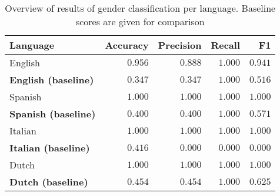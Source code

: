 \documentclass[utf8]{beamer}
\begin{document}
\begin{frame}
	\begin{table}
		\caption{Overview of results of gender classification per language. Baseline scores are given for comparison}
		\label{tab:scores-gender}
		\begin{center}
			\begin{tabular}{l|rrrr}
				\toprule
				Language & Accuracy & Precision & Recall & F1 \\
				\midrule
				English & $ 0.956 $ & $ 0.888 $ & $ 1.000 $ & $ 0.941 $ \\
				\textbf{English (baseline)} & $ 0.347 $ & $ 0.347 $ & $ 1.000 $ & $ 0.516 $ \\
				Spanish & $ 1.000 $ & $ 1.000 $ & $ 1.000 $ & $ 1.000 $ \\
				\textbf{Spanish (baseline)} & $ 0.400 $ & $ 0.400 $ & $ 1.000 $ & $ 0.571 $ \\
				Italian & $ 1.000 $ & $ 1.000 $ & $ 1.000 $ & $ 1.000 $ \\
				\textbf{Italian (baseline)} & $ 0.416 $ & $ 0.000 $ & $ 0.000 $ & $ 0.000 $ \\
				Dutch & $ 1.000 $ & $ 1.000 $ & $ 1.000 $ & $ 1.000 $ \\
				\textbf{Dutch (baseline)} & $ 0.454 $ & $ 0.454 $ & $ 1.000 $ & $ 0.625 $ \\
				\bottomrule
			\end{tabular}
		\end{center}
	\end{table}
\end{frame}
\end{document}
